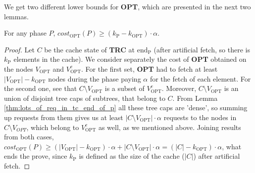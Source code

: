 We get two different lower bounds for \textbf{OPT}, which are presented in the
next two lemmas.
\begin{lemma}
For any phase $P$, $cost_{\mathrm{OPT}}(P) \geq
(k_{\mathrm{P}} - k_{\mathrm{OPT}}) \cdot \alpha$.  \label{thm:opt_bound_with_k}
\end{lemma}
\begin{proof}
Let $C$ be the cache state of \textbf{TRC} at
$\mathrm{end_P}$ (after artificial fetch, so there is $k_{\mathrm{P}}$ elements in the
cache). We consider separately the cost of \textbf{OPT} obtained on the nodes
$V_{\mathrm{OPT}}$ and $V_{\mathrm{OPT}}^c$. For the first set, \textbf{OPT} had
to fetch at least $|V_{\mathrm{OPT}}| - k_{\mathrm{OPT}}$ nodes during the phase
paying $\alpha$ for the fetch of each element. For the second one, see that $C \setminus
V_{\mathrm{OPT}}$ is a subset of $V_{\mathrm{OPT}}^c$. Moreover, $C \setminus
V_{\mathrm{OPT}}$ is an union of disjoint tree caps of subtrees, that belong to
$C$. From Lemma \ref{thm:lots_of_req_in_tc_end_of_p} all these tree caps are
'dense', so summing up requests from them gives us at least $|C \setminus
V_{\mathrm{OPT}}| \cdot \alpha$ requests to the nodes in $C \setminus V_{OPT}$,
which belong to $V_{\mathrm{OPT}}^c$ as well, as we mentioned above. Joining
results from both cases, $cost_{\mathrm{OPT}}(P) \geq (|V_{\mathrm{OPT}}| -
k_{\mathrm{OPT}}) \cdot \alpha + |C \setminus V_{\mathrm{OPT}}| \cdot \alpha =
(|C| - k_{\mathrm{OPT}}) \cdot \alpha$, what ends the prove, since $k_{\mathrm{P}}$ is
defined as the size of the cache ($|C|$) after artificial fetch.
\end{proof}
